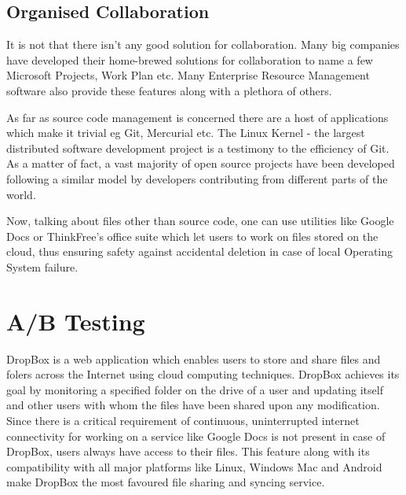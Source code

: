 \subsection{Organised Collaboration}
It is not that there isn't any good solution for collaboration. Many big companies have developed their home-brewed solutions for collaboration to name a few Microsoft Projects, Work Plan etc. Many Enterprise Resource Management software also provide these features along with a plethora of others.\par
As far as source code management is concerned there are a host of applications which make it trivial eg Git, Mercurial etc. The Linux Kernel - the largest distributed software development project is a testimony to the efficiency of Git. As a matter of fact, a vast majority of open source projects have been developed following a similar model by developers contributing from different parts of the world.\par
Now, talking about files other than source code, one can use utilities like Google Docs or ThinkFree's office suite which let users to work on files stored on the cloud, thus ensuring safety against accidental deletion in case of local Operating System failure.

\section{A/B Testing}
DropBox is a web application which enables users to store and share files and folers across the Internet using cloud computing techniques. DropBox achieves its goal by monitoring a specified folder on the drive of a user and updating itself and other users with whom the files have been shared upon any modification. Since there is a critical requirement of continuous, uninterrupted internet connectivity for working on a service like Google Docs is not present in case of DropBox, users always have access to their files. This feature along with its compatibility with all major platforms like Linux, Windows Mac and Android make DropBox the most favoured file sharing and syncing service.

